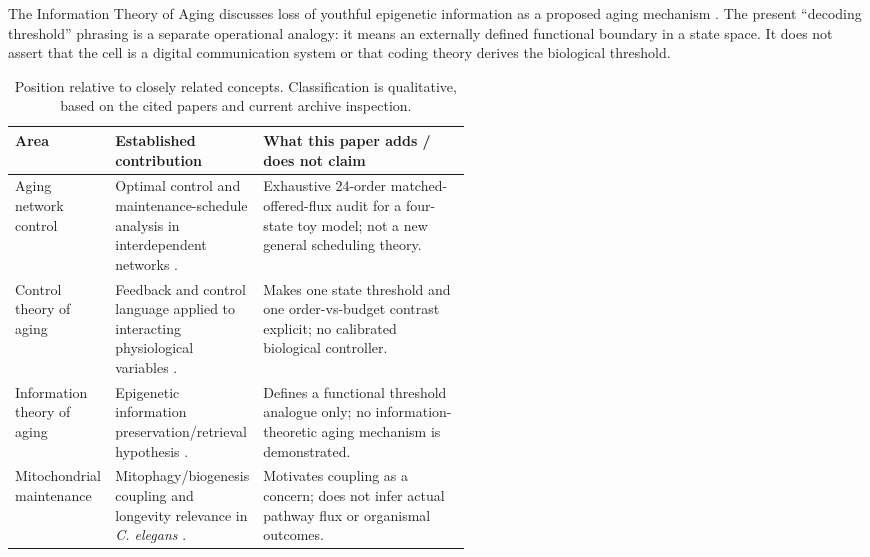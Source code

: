 \documentclass[10pt,letterpaper]{article}
\begin{document}
The Information Theory of Aging discusses loss of youthful epigenetic information as a proposed aging mechanism \cite{Lu2023InformationAging}. The present “decoding threshold” phrasing is a separate operational analogy: it means an externally defined functional boundary in a state space. It does not assert that the cell is a digital communication system or that coding theory derives the biological threshold.

\begin{table}[H]
\centering\small
\caption{Position relative to closely related concepts. Classification is qualitative, based on the cited papers and current archive inspection.}
\begin{tabularx}{\linewidth}{p{0.22\linewidth}p{0.31\linewidth}X}
\toprule
\textbf{Area} & \textbf{Established contribution} & \textbf{What this paper adds / does not claim}\\
\midrule
Aging network control & Optimal control and maintenance-schedule analysis in interdependent networks \cite{Sun2020OptimalControl}. & Exhaustive 24-order matched-offered-flux audit for a four-state toy model; not a new general scheduling theory.\\
Control theory of aging & Feedback and control language applied to interacting physiological variables \cite{MurphyPartridge2008Control}. & Makes one state threshold and one order-vs-budget contrast explicit; no calibrated biological controller.\\
Information theory of aging & Epigenetic information preservation/retrieval hypothesis \cite{Lu2023InformationAging}. & Defines a functional threshold analogue only; no information-theoretic aging mechanism is demonstrated.\\
Mitochondrial maintenance & Mitophagy/biogenesis coupling and longevity relevance in \textit{C. elegans} \cite{Palikaras2015Mitophagy}. & Motivates coupling as a concern; does not infer actual pathway flux or organismal outcomes.\\
\bottomrule
\end{tabularx}
\end{table}
\end{document}
